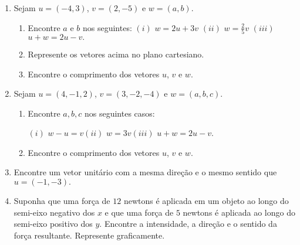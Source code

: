 \documentclass{report}
\begin{document}
\begin{Exercise}
\begin{enumerate}


\item \label{1lista3} Sejam $u=(-4,3)$, $v=(2,-5)$ e $w=(a,b)$.
\begin{enumerate}
    \item Encontre $a$ e $b$ nos seguintes:
    $(i)$ $w=2u+3v$ \qquad $(ii)$ $w=\frac{2}{5}v$ \qquad $(iii)$
    $u+w=2u-v.$
    \item Represente os vetores acima no plano cartesiano.
    \item Encontre o comprimento dos vetores $u$, $v$ e $w$.
\end{enumerate}


\item \label{2lista3} Sejam $u=\left( 4,-1,2\right) $, $v=\left( 3,-2,-4\right) $ e $%
w=(a,b,c)$.
\begin{enumerate}
    \item Encontre $a,b,c$ nos seguintes casos:

    $(i)$ $w-u=v$\qquad $(ii)$ $w=3v$\qquad $(iii)$ $u+w=2u-v.$
    \item  Encontre o comprimento dos vetores $u$, $v$ e $w$.
\end{enumerate}


\item \label{3lista3} Encontre um vetor unit\'{a}rio com a
mesma dire\c{c}\~{a}o e o mesmo sentido que $u=(-1,-3).$



\item \label{4lista3} Suponha que uma for\c{c}a de $12$
newtons \'{e} aplicada em um objeto ao longo do semi-eixo negativo
dos $x$ e que uma for\c{c}a de $5$ newtons \'{e} aplicada ao longo
do semi-eixo positivo dos $y$. Encontre a intensidade, a
dire\c{c}\~{a}o e o sentido da for\c{c}a resultante. Represente
graficamente.


\end{enumerate}
\end{Exercise}
\end{document}
